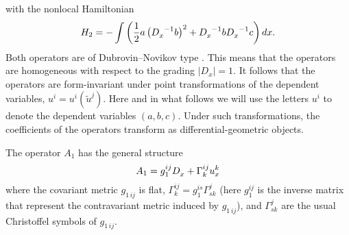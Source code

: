 with the nonlocal Hamiltonian
\begin{displaymath}
  H_2=-\int\left(  \frac{1}{2}a\left({D_x^{}}^{-1}b\right)^2 + {D_x^{}}^{-1}b
  {D_x^{}}^{-1}c\right)dx.
\end{displaymath}
Both operators are of Dubrovin--Novikov type \cite{DubrovinNovikov:83,DubrovinNovikov:84}. 
This means that the
operators are homogeneous with respect to the grading $|D_x|=1$. It follows
that the operators are form-invariant under point transformations of the
dependent variables, $u^i=u^i(\tilde u^j)$. Here and in what follows we will
use the letters $u^i$ to denote the dependent variables $(a,b,c)$. Under such
transformations, the coefficients of the operators transform as
differential-geometric objects.

The operator $A_1$ has the general structure
\begin{displaymath}
  A_1 = g_1^{ij}D_x^{} + \Gamma^{ij}_ku^k_x
\end{displaymath}
where the covariant metric $g_{1\,ij}$ is flat, $\Gamma^{ij}_k =
g_1^{is}\Gamma^j_{sk}$ (here $g_1^{ij}$ is the inverse matrix that represent
the contravariant metric induced by $g_{1\,ij}$), and $\Gamma^j_{sk}$ are the
usual Christoffel symbols of $g_{1\,ij}$.

